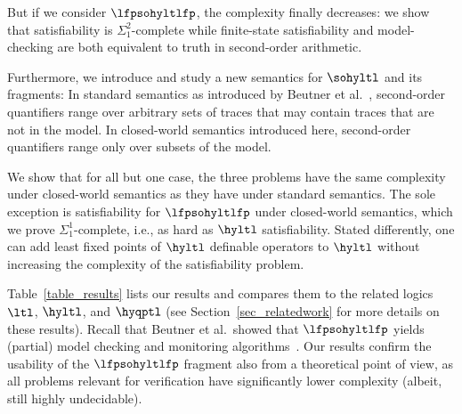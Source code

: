 But if we consider $\lfpsohyltlfp$, the complexity finally decreases: we show that satisfiability is $\Sigma_1^2$-complete while finite-state satisfiability and model-checking are both equivalent to truth in second-order arithmetic.

Furthermore, we introduce and study a new semantics for $\sohyltl$ and its fragments: 
In standard semantics as introduced by Beutner et al.~\cite{DBLP:conf/cav/BeutnerFFM23}, second-order quantifiers range over arbitrary sets of traces that may contain traces that are not in the model.
In closed-world semantics introduced here, second-order quantifiers range only over subsets of the model. 

We show that for all but one case, the three problems have the same complexity under closed-world semantics as they have under standard semantics. 
The sole exception is satisfiability for $\lfpsohyltlfp$ under closed-world semantics, which we prove $\Sigma_1^1$-complete, i.e., as hard as $\hyltl$ satisfiability.
Stated differently, one can add least fixed points of $\hyltl$ definable operators to $\hyltl$ without increasing the complexity of the satisfiability problem. 


Table~\ref{table_results} lists our results and compares them to the related logics~$\ltl$, $\hyltl$, and $\hyqptl$ (see Section~\ref{sec_relatedwork} for more details on these results). 
Recall that Beutner et al.\ showed that $\lfpsohyltlfp$ yields (partial) model checking and monitoring algorithms~\cite{DBLP:conf/cav/BeutnerFFM23,BeutnerFFM24}. 
Our results confirm the usability of the $\lfpsohyltlfp$ fragment also from a theoretical point of view, as all problems relevant for verification have significantly lower complexity (albeit, still  highly undecidable).

